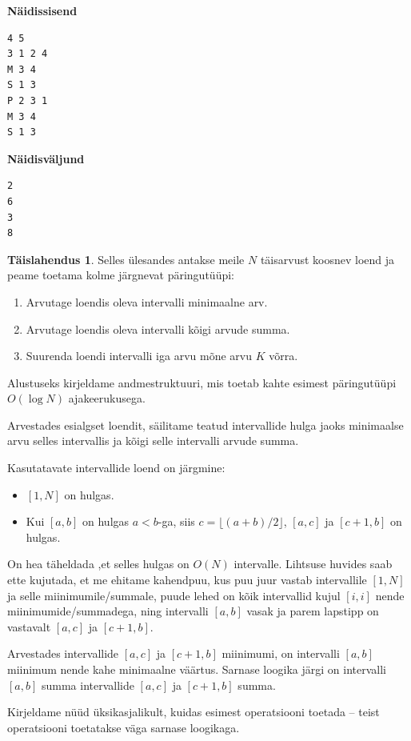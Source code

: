\documentclass{trkut}
\theoremstyle{definition}
\newtheorem*{solution}{Täislahendus}
\begin{document}
\textbf{Näidissisend}

\begin{verbatim}
4 5
3 1 2 4
M 3 4
S 1 3
P 2 3 1
M 3 4
S 1 3
\end{verbatim}

\textbf{Näidisväljund}

\begin{verbatim}
2
6
3
8
\end{verbatim}


\begin{solution}
Selles ülesandes antakse meile $N$ täisarvust koosnev loend ja peame toetama kolme järgnevat päringutüüpi:

\begin{enumerate}
    \item Arvutage loendis oleva intervalli minimaalne arv.
    \item Arvutage loendis oleva intervalli kõigi arvude summa.
    \item Suurenda loendi intervalli iga arvu mõne arvu $K$ võrra.
\end{enumerate}

Alustuseks kirjeldame andmestruktuuri, mis toetab kahte esimest päringutüüpi $O(\log N)$ ajakeerukusega.

Arvestades esialgset loendit, säilitame teatud intervallide hulga jaoks minimaalse arvu selles intervallis ja kõigi selle intervalli arvude summa. 

Kasutatavate intervallide loend on järgmine:
\begin{itemize}
    \item $[1,N]$ on hulgas.
    \item Kui $[a,b]$ on hulgas $a<b$-ga, siis $c=⌊{(a+b)}/2⌋$, $[a,c]$ ja $[c+1,b]$ on hulgas.
\end{itemize}


On hea täheldada ,et selles hulgas on $O(N)$ intervalle. 
Lihtsuse huvides saab ette kujutada, et me ehitame kahendpuu, kus puu juur vastab intervallile $[1,N]$ ja selle miinimumile/summale, puude lehed on kõik intervallid kujul $[i,i]$ nende miinimumide/summadega, ning intervalli $[a,b]$ vasak ja parem lapstipp on vastavalt $[a,c]$ ja $[c+1,b]$.

Arvestades intervallide $[a,c]$ ja $[c+1,b]$ miinimumi, on intervalli $[a,b]$ miinimum nende kahe minimaalne väärtus. Sarnase loogika järgi on intervalli $[a,b]$ summa intervallide $[a,c]$ ja $[c+1,b]$ summa.

Kirjeldame nüüd üksikasjalikult, kuidas esimest operatsiooni toetada – teist operatsiooni toetatakse väga sarnase loogikaga.


\end{solution}
\end{document}
